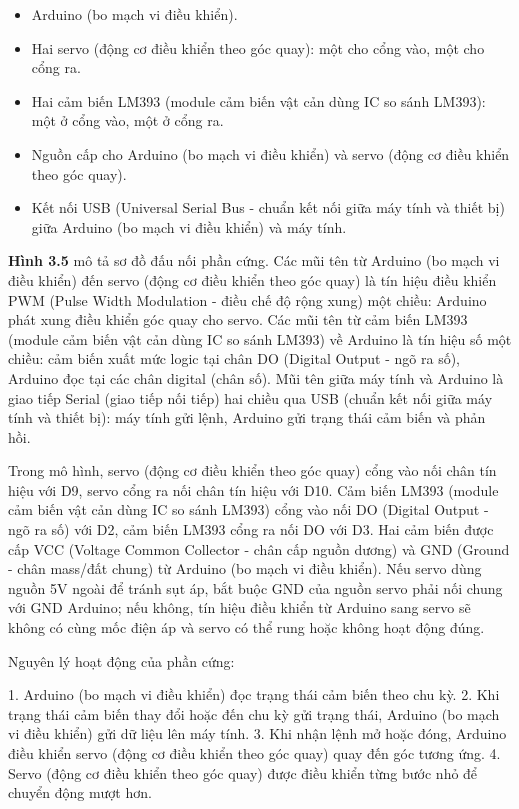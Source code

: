 \documentclass[a4paper,14pt]{extreport}
\begin{document}
\begin{itemize}[leftmargin=2em]
  \item Arduino (bo mạch vi điều khiển).
  \item Hai servo (động cơ điều khiển theo góc quay): một cho cổng vào, một cho cổng ra.
  \item Hai cảm biến LM393 (module cảm biến vật cản dùng IC so sánh LM393): một ở cổng vào, một ở cổng ra.
  \item Nguồn cấp cho Arduino (bo mạch vi điều khiển) và servo (động cơ điều khiển theo góc quay).
  \item Kết nối USB (Universal Serial Bus - chuẩn kết nối giữa máy tính và thiết bị) giữa Arduino (bo mạch vi điều khiển) và máy tính.
\end{itemize}
\textbf{Hình 3.5} mô tả sơ đồ đấu nối phần cứng. Các mũi tên từ Arduino (bo mạch vi điều khiển) đến servo (động cơ điều khiển theo góc quay) là tín hiệu điều khiển PWM (Pulse Width Modulation - điều chế độ rộng xung) một chiều: Arduino phát xung điều khiển góc quay cho servo. Các mũi tên từ cảm biến LM393 (module cảm biến vật cản dùng IC so sánh LM393) về Arduino là tín hiệu số một chiều: cảm biến xuất mức logic tại chân DO (Digital Output - ngõ ra số), Arduino đọc tại các chân digital (chân số). Mũi tên giữa máy tính và Arduino là giao tiếp Serial (giao tiếp nối tiếp) hai chiều qua USB (chuẩn kết nối giữa máy tính và thiết bị): máy tính gửi lệnh, Arduino gửi trạng thái cảm biến và phản hồi.

Trong mô hình, servo (động cơ điều khiển theo góc quay) cổng vào nối chân tín hiệu với D9, servo cổng ra nối chân tín hiệu với D10. Cảm biến LM393 (module cảm biến vật cản dùng IC so sánh LM393) cổng vào nối DO (Digital Output - ngõ ra số) với D2, cảm biến LM393 cổng ra nối DO với D3. Hai cảm biến được cấp VCC (Voltage Common Collector - chân cấp nguồn dương) và GND (Ground - chân mass/đất chung) từ Arduino (bo mạch vi điều khiển). Nếu servo dùng nguồn 5V ngoài để tránh sụt áp, bắt buộc GND của nguồn servo phải nối chung với GND Arduino; nếu không, tín hiệu điều khiển từ Arduino sang servo sẽ không có cùng mốc điện áp và servo có thể rung hoặc không hoạt động đúng.

Nguyên lý hoạt động của phần cứng:

1. Arduino (bo mạch vi điều khiển) đọc trạng thái cảm biến theo chu kỳ.
2. Khi trạng thái cảm biến thay đổi hoặc đến chu kỳ gửi trạng thái, Arduino (bo mạch vi điều khiển) gửi dữ liệu lên máy tính.
3. Khi nhận lệnh mở hoặc đóng, Arduino điều khiển servo (động cơ điều khiển theo góc quay) quay đến góc tương ứng.
4. Servo (động cơ điều khiển theo góc quay) được điều khiển từng bước nhỏ để chuyển động mượt hơn.
\end{document}
